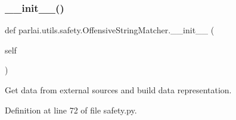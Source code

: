 \subsubsection{\texorpdfstring{\+\_\+\+\_\+init\+\_\+\+\_\+()}{\_\_init\_\_()}}
{\footnotesize\ttfamily def parlai.\+utils.\+safety.\+Offensive\+String\+Matcher.\+\_\+\+\_\+init\+\_\+\+\_\+ (\begin{DoxyParamCaption}\item[{}]{self }\end{DoxyParamCaption})}

\begin{DoxyVerb}Get data from external sources and build data representation.
\end{DoxyVerb}
 

Definition at line 72 of file safety.\+py.


